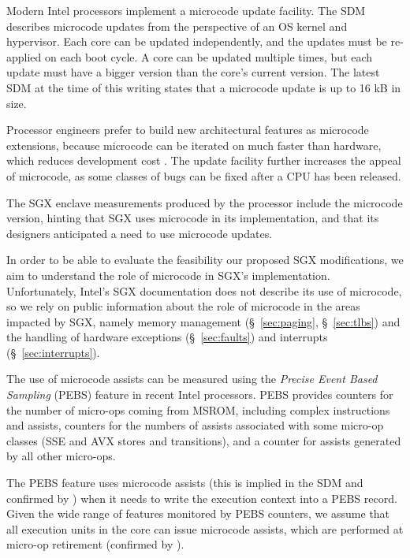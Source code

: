 
Modern Intel processors implement a microcode update facility. The SDM
describes microcode updates from the perspective of an OS kernel and
hypervisor. Each core can be updated independently, and the updates must be
re-applied on each boot cycle. A core can be updated multiple times, but each
update must have a bigger version than the core's current version. The latest
SDM at the time of this writing states that a microcode update is up to 16 kB
in size.

Processor engineers prefer to build new architectural features as microcode
extensions, because microcode can be iterated on much faster than hardware,
which reduces development cost \cite{intel2008genetic, intel2012clusters}. The
update facility further increases the appeal of microcode, as some classes of
bugs can be fixed after a CPU has been released.

The SGX enclave measurements produced by the processor include the microcode
version, hinting that SGX uses microcode in its implementation, and that its
designers anticipated a need to use microcode updates.

In order to be able to evaluate the feasibility our proposed SGX modifications,
we aim to understand the role of microcode in SGX's implementation.
Unfortunately, Intel's SGX documentation does not describe its use of
microcode, so we rely on public information about the role of microcode in the
areas impacted by SGX, namely memory management (\S~\ref{sec:paging},
\S~\ref{sec:tlbs}) and the handling of hardware exceptions
(\S~\ref{sec:faults}) and interrupts (\S~\ref{sec:interrupts}).


The use of microcode assists can be measured using the
\textit{Precise Event Based Sampling} (PEBS) feature in recent Intel
processors. PEBS provides counters for the number of micro-ops coming from
MSROM, including complex instructions and assists, counters for the numbers of
assists associated with some micro-op classes (SSE and AVX stores and
transitions), and a counter for assists generated by all other micro-ops.

The PEBS feature uses microcode assists (this is implied in the SDM and
confirmed by \cite{intel2014pebs}) when it needs to write the execution context
into a PEBS record. Given the wide range of features monitored by PEBS
counters, we assume that all execution units in the core can issue microcode
assists, which are performed at micro-op retirement (confirmed by
\cite{intel1997events}).


